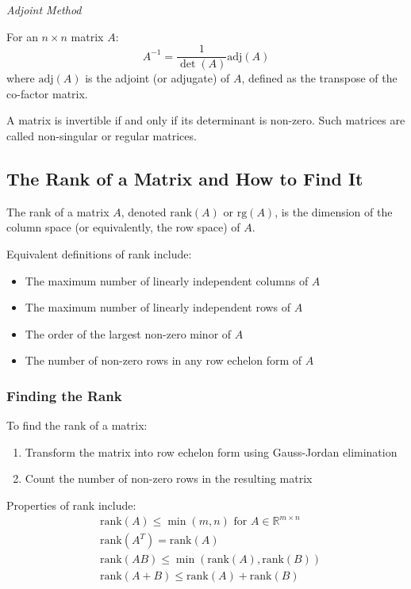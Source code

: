 \emph{Adjoint Method}

For an \(n \times n\) matrix \(A\):
\begin{equation*}
A^{-1} = \frac{1}{\det(A)} \text{adj}(A)
\end{equation*}
where \(\text{adj}(A)\) is the adjoint (or adjugate) of \(A\), defined as the transpose of the co-factor matrix.

A matrix is invertible if and only if its determinant is non-zero. Such matrices are called non-singular or regular matrices.

\subsection{The Rank of a Matrix and How to Find It}

The rank of a matrix \(A\), denoted \(\text{rank}(A)\) or \(\text{rg}(A)\), is the dimension of the column space (or equivalently, the row space) of \(A\).

Equivalent definitions of rank include:
\begin{itemize}[label=\(-\)]
    \item The maximum number of linearly independent columns of \(A\)
    \item The maximum number of linearly independent rows of \(A\)
    \item The order of the largest non-zero minor of \(A\)
    \item The number of non-zero rows in any row echelon form of \(A\)
\end{itemize}

\subsubsection{Finding the Rank}

To find the rank of a matrix:
\begin{enumerate}
    \item Transform the matrix into row echelon form using Gauss-Jordan elimination
    \item Count the number of non-zero rows in the resulting matrix
\end{enumerate}

Properties of rank include:
\begin{align*}
&\text{rank}(A) \leq \min(m,n) \text{ for } A \in \mathbb{R}^{m \times n} \\
&\text{rank}(A^T) = \text{rank}(A) \\
&\text{rank}(AB) \leq \min(\text{rank}(A), \text{rank}(B)) \\
&\text{rank}(A+B) \leq \text{rank}(A) + \text{rank}(B)
\end{align*}

